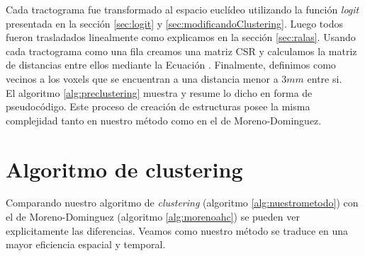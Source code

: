 Cada tractograma fue transformado al espacio eucl\'ideo utilizando la 
funci\'on \textit{logit} presentada en la secci\'on \ref{sec:logit} y 
\ref{sec:modificandoClustering}. Luego todos fueron trasladados linealmente
como explicamos en la secci\'on \ref{sec:ralas}. Usando cada tractograma como una
fila creamos una matriz CSR y calculamos la matriz de distancias entre ellos 
mediante la Ecuaci\'on \label{eq:simileuc}. Finalmente, definimos como vecinos
a los voxels que se encuentran a una distancia menor a $3mm$ entre si. \\  

El algoritmo \ref{alg:preclustering} muestra y resume lo dicho en forma de
pseudoc\'odigo. Este proceso de creaci\'on de estructuras
posee la misma complejidad tanto en nuestro m\'etodo como en el de Moreno-Dominguez. \\

\section{Algoritmo de clustering}

Comparando nuestro algoritmo de \textit{clustering} (algoritmo 
\ref{alg:nuestrometodo}) con el de Moreno-Dominguez (algoritmo \ref{alg:morenoahc})
se pueden ver explicitamente las diferencias. Veamos como nuestro m\'etodo se 
traduce en una mayor eficiencia espacial y temporal. \\

\settowidth{}
\addtolength\mylen{\parindent}

